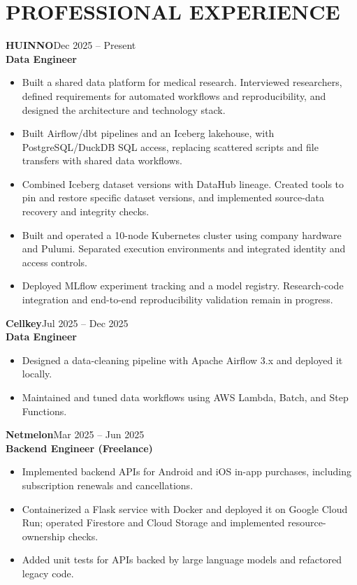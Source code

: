 \documentclass[a4paper,10pt]{article}
\newcommand{\employer}[3]{\vspace{5pt}\textbf{\color{accent}#1}\hfill{\small\color{muted}#2}\\\textbf{#3}\par}
\begin{document}
\section{PROFESSIONAL EXPERIENCE}
\employer{HUINNO}{Dec 2025 -- Present}{Data Engineer}
\begin{itemize}
\item Built a shared data platform for medical research. Interviewed researchers, defined requirements for automated workflows and reproducibility, and designed the architecture and technology stack.
\item Built Airflow/dbt pipelines and an Iceberg lakehouse, with PostgreSQL/DuckDB SQL access, replacing scattered scripts and file transfers with shared data workflows.
\item Combined Iceberg dataset versions with DataHub lineage. Created tools to pin and restore specific dataset versions, and implemented source-data recovery and integrity checks.
\item Built and operated a 10-node Kubernetes cluster using company hardware and Pulumi. Separated execution environments and integrated identity and access controls.
\item Deployed MLflow experiment tracking and a model registry. Research-code integration and end-to-end reproducibility validation remain in progress.
\end{itemize}

\employer{Cellkey}{Jul 2025 -- Dec 2025}{Data Engineer}
\begin{itemize}
\item Designed a data-cleaning pipeline with Apache Airflow 3.x and deployed it locally.
\item Maintained and tuned data workflows using AWS Lambda, Batch, and Step Functions.
\end{itemize}

\employer{Netmelon}{Mar 2025 -- Jun 2025}{Backend Engineer (Freelance)}
\begin{itemize}
\item Implemented backend APIs for Android and iOS in-app purchases, including subscription renewals and cancellations.
\item Containerized a Flask service with Docker and deployed it on Google Cloud Run; operated Firestore and Cloud Storage and implemented resource-ownership checks.
\item Added unit tests for APIs backed by large language models and refactored legacy code.
\end{itemize}
\end{document}
